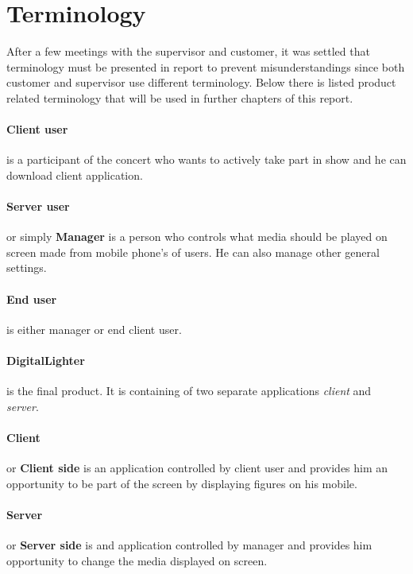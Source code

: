 \section {Terminology}
\label{sec:terminology}
After a few meetings with the supervisor and customer, it was settled that terminology must be presented in report to prevent misunderstandings since both customer and supervisor use different terminology.
Below there is listed product related terminology that will be used in further chapters of this report.

\paragraph{Client user}
is a participant of the concert who wants to actively take part in show and he can download client application.

\paragraph{Server user}
or simply \textbf{Manager} is a person who controls what media should be played on screen made from mobile phone's of users. 
He can also manage other general settings.

\paragraph{End user} is either manager or end client user.

\paragraph{DigitalLighter}
is the final product. It is containing of two separate applications \emph{client} and \emph{server}.


\paragraph{Client} or \textbf{Client side} is an application controlled by client user and provides him an opportunity to be part of the screen by displaying figures on his mobile.

\paragraph{Server} or \textbf{Server side} is and application controlled by manager and provides him opportunity to change the media displayed on screen.

